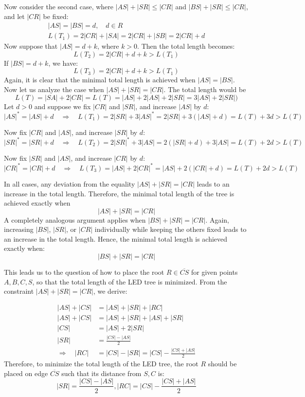 \documentclass[12pt]{article}
\begin{document}
	Now consider the second case, where \( |AS| + |SR| \leq |CR| \) and \( |BS| + |SR| \leq |CR| \), and let \( |CR| \) be fixed:
	\begin{align*}
		|AS| = |BS| = d, \quad d \in R \\
		L(T_1) = 2|CR| + |SA| = 2|CR| + |SB| = 2|CR| + d
	\end{align*}
	Now suppose that \( |AS| = d + k \), where \( k > 0 \). Then the total length becomes:
	\[
	L(T_2) = 2|CR| + d + k > L(T_1)
	\]
	If \( |BS| = d + k \), we have:
	\[
	L(T_3) = 2|CR| + d + k > L(T_1)
	\]
	Again, it is clear that the minimal total length is achieved when \( |AS| = |BS| \).\\

	Now let us analyze the case when \(|AS|+|SR| = |CR| \).
	The total length would be \[ L(T) = |SA| + 2 |CR| = L(T) = |AS| + 2|AS| + 2|SR| = 3|AS| + 2|SR|  )\]
	Let \( d > 0 \) and suppose we fix \( |CR| \) and \( |SR| \), and increase \( |AS| \) by \( d \):
	\[
	|AS|^* = |AS| + d \quad \Rightarrow \quad L(T_1) = 2|SR| + 3|AS|^* = 2|SR| + 3(|AS| + d) = L(T) + 3d > L(T)
	\]
	
	Now fix \( |CR| \) and \( |AS| \), and increase \( |SR| \) by \( d \):
	\[
	|SR|^* = |SR| + d \quad \Rightarrow \quad L(T_2) = 2|SR|^* + 3|AS| = 2(|SR| + d) + 3|AS| = L(T) + 2d > L(T)
	\]
	
	Now fix \( |SR| \) and \( |AS| \), and increase \( |CR| \) by \( d \):
	\[
	|CR|^* = |CR| + d \quad \Rightarrow \quad L(T_3) = |AS| + 2|CR|^* = |AS| + 2(|CR| + d) = L(T) + 2d > L(T)
	\]
	
	In all cases, any deviation from the equality \( |AS| + |SR| = |CR| \) leads to an increase in the total length.  
	Therefore, the minimal total length of the tree is achieved exactly when
	\[
	|AS| + |SR| = |CR|
	\]
	A completely analogous argument applies when \( |BS| + |SR| = |CR| \).  
	Again, increasing \( |BS| \), \( |SR| \), or \( |CR| \) individually while keeping the others fixed leads to an increase in the total length.  
	Hence, the minimal total length is achieved exactly when:
	\[
	|BS| + |SR| = |CR|
	\]
	
	
	This leads us to the question of how to place the root \( R \in \overline{CS} \) for given points \( A, B, C, S \), so that the total length of the LED tree is minimized. From the constraint \( |AS|+|SR| = |CR|  \), we derive:
	
	\begin{align*}
		|AS| + |CS| &= |AS| + |SR| + |RC| \\
		|AS|+|CS| &= |AS|+|SR|+|AS|+|SR| \\ 
		|CS| &= |AS|+2|SR| \\
		|SR| &= \frac{|CS| - |AS|}{2} \\
		\Rightarrow \quad |RC| &= |CS| - |SR| = |CS| - \frac{|CS| + |AS|}{2}
	\end{align*}
	Therefore, to minimize the total length of the LED tree, the root \( R \) should be placed on edge \( \overline{CS} \) such that its distance from \( S, C\) is:
	\[
	|SR| = \frac{|CS| - |AS|}{2},  |RC| = |CS| - \frac{|CS| + |AS|}{2}
	\]
	
\end{document}
